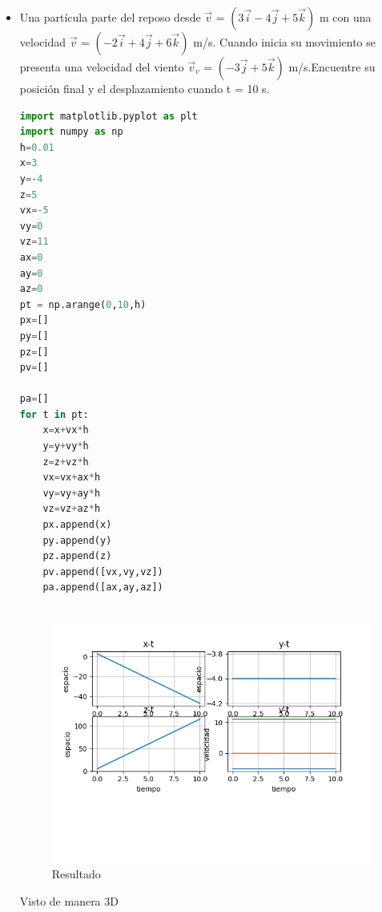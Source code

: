 \documentclass{article}
\begin{document}
\begin{flushleft}
\begin{enumerate}
\begin{itemize}
    
    
    \item Una partícula parte del reposo desde $\vec{v}$ = $(3\vec{i}- 4\vec{j} + 5\vec{k})$ m con una velocidad $\vec{v}$ = $(−2\vec{i}+ 4\vec{j} + 6\vec{k})$ m/s. Cuando inicia su movimiento se presenta una velocidad del viento $\vec{v}_v$ = $(−3\vec{j} + 5\vec{k})$ m/s.Encuentre su posición final y el desplazamiento cuando t = 10 s.
    
    \begin{lstlisting}[language=Python,caption=Ejercicio 2]
import matplotlib.pyplot as plt
import numpy as np
h=0.01
x=3
y=-4
z=5
vx=-5
vy=0
vz=11
ax=0
ay=0
az=0
pt = np.arange(0,10,h)
px=[]
py=[]
pz=[]
pv=[]

pa=[]
for t in pt:
    x=x+vx*h
    y=y+vy*h
    z=z+vz*h
    vx=vx+ax*h
    vy=vy+ay*h
    vz=vz+az*h
    px.append(x)
    py.append(y)
    pz.append(z)
    pv.append([vx,vy,vz])
    pa.append([ax,ay,az])
    
    \end{lstlisting}
    
    
    \begin{figure}[H]
    \centering
    \includegraphics[width=1.2\textwidth]{3.2.png}
    \caption{Resultado}
    \end{figure}
    
    Visto de manera 3D
    

\end{itemize}
\end{enumerate}
\end{flushleft}
\end{document}
